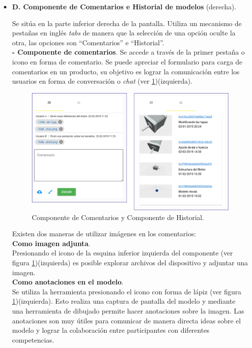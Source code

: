 \begin{itemize}
\item \textbf{D. Componente de Comentarios e Historial de modelos} (derecha).



\begin{itemize}
 Se sitúa en la parte inferior  derecha de la pantalla. Utiliza un mecanismo de pestañas en inglés \textit{tabs} de manera que la selección de una opción oculte la otra, las opciones son ``Comentarios'' e ``Historial''.\\
 
 

 \textbf{- Componente de comentarios}. 
 Se accede a través de la primer pestaña o icono en forma de comentario. Se puede apreciar el formulario para carga de comentarios en un producto, su objetivo es lograr la comunicación entre los usuarios en forma de conversación o \textit{chat} (ver \ref{fig:comment0})(izquierda).
 
 \begin{figure}[h]
    \includegraphics[width=14cm]{Img/Desarrollo/comentario00.png}
    \centering
    \caption{\footnotesize{Componente de Comentarios y Componente de Historial.}}
    \label{fig:comment0}
\end{figure}


 Existen dos maneras de utilizar imágenes en los comentarios:\\
 

\textbf{Como imagen adjunta}. \\
Presionando el icono de la esquina inferior izquierda del componente (ver figura \ref{fig:comment0})(izquierda) es posible explorar archivos del dispositivo y adjuntar una imagen. 
\\
\textbf{Como anotaciones en el modelo}. \\
Se utiliza la herramienta presionando el icono con forma de lápiz (ver figura \ref{fig:comment0})(izquierda). Esto realiza una captura de pantalla del modelo y mediante una herramienta de dibujado permite hacer anotaciones sobre la imagen. Las anotaciones son muy útiles para comunicar de manera directa ideas sobre el modelo y lograr la colaboración entre participantes con diferentes competencias.


\end{itemize}
\end{itemize}
